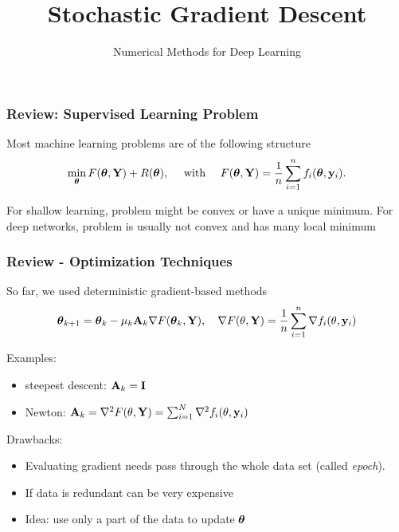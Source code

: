 \documentclass[12pt,fleqn,beamer]{beamer}
\date{}
\title{Stochastic Gradient Descent}
\subtitle{Numerical Methods for Deep Learning}
\begin{document}
\makebeamertitle

\begin{frame}[fragile]\frametitle{Review: Supervised Learning Problem}

Most machine learning problems are of the following structure
$$
\min_{{\boldsymbol \theta}} F({\boldsymbol \theta},{\bf Y}) + R({\boldsymbol \theta}), \quad \text{ with }\quad  F({\boldsymbol \theta},{\bf Y}) = \frac1n\sum_{i=1}^n f_i({\boldsymbol \theta},{\bf y}_i).
$$

\bigskip
\pause

For shallow learning, problem might be convex or have a unique minimum.
For deep networks, problem is usually not convex and has many local minimum

\end{frame}

\begin{frame}[fragile]\frametitle{Review - Optimization Techniques}

So far, we used deterministic gradient-based methods
$$ {\boldsymbol \theta}_{k+1} = {\boldsymbol \theta}_k - \mu_k {\bf A}_k \nabla F({\boldsymbol \theta}_k,{\bf Y}), \quad  \nabla F(\theta,{\bf Y}) = \frac1n  \sum_{i=1}^n \nabla f_i(\theta, {\bf y}_i)$$

\smallskip 
\pause

Examples: 
\begin{itemize}
	\item steepest descent: $ {\bf A}_k = {\bf I}$
	\item Newton: ${\bf A}_k = \nabla^{2} F(\theta,{\bf Y}) = \sum_{i=1}^N \nabla^{2} f_i(\theta, {\bf y}_i)$
\end{itemize}

\bigskip
\pause

Drawbacks:
\begin{itemize}
\item
Evaluating gradient needs pass through the whole data set (called \emph{epoch}).
\item
If data is redundant can be very expensive
\item 
Idea: use only a part of the data to update ${\boldsymbol \theta}$
\end{itemize} 



\end{frame}
\end{document}
